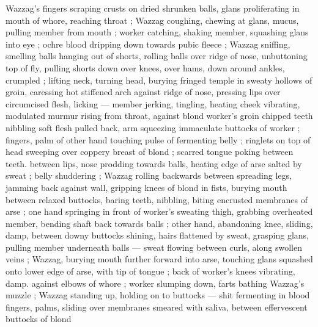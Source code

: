 Wazzag's fingers scraping crusts on dried shrunken balls, glans 
proliferating in mouth of whore, reaching throat ; Wazzag coughing, 
chewing at glans, mucus, pulling member from mouth ; worker 
catching, shaking member, squashing glans into eye ; ochre blood 
dripping down towards pubic fleece  ; Wazzag sniffing, 
smelling balls hanging out of shorts, rolling balls over ridge of nose, 
unbuttoning top of fly, pulling shorts down over knees, over hams, 
down around ankles, crumpled ; lifting neck, turning head, burying 
fringed temple in sweaty hollows of groin, caressing hot stiffened 
arch against ridge of nose, pressing lips over circumcised flesh, 
licking --- member jerking, tingling, heating {\dashcom} cheek vibrating, 
modulated murmur rising from throat, against blond worker's groin 
chipped teeth nibbling soft flesh pulled back, arm squeezing 
immaculate buttocks of worker ; fingers, palm of other hand touching 
pulse of fermenting belly ; ringlets on top of head sweeping over 
coppery breast of blond ; scarred tongue poking between teeth. 
between lips, nose prodding towards balls, heating edge of arse 
salted by sweat ; belly shuddering ; Wazzag rolling backwards 
between spreading legs, jamming back against wall, gripping knees 
of blond in fists, burying mouth between relaxed buttocks, baring 
teeth, nibbling, biting encrusted membranes of arse ; one hand 
springing in front of worker's sweating thigh, grabbing overheated 
member, bending shaft back towards balls ; other hand, abandoning 
knee, sliding, damp, between downy buttocks shining, hairs flattened 
by sweat, grasping glans, pulling member underneath balls --- sweat 
flowing between curls, along swollen veins ; Wazzag, burying mouth 
further forward into arse, touching glans squashed onto lower edge 
of arse, with tip of tongue ; back of worker's knees vibrating, damp. 
against elbows of whore ; worker slumping down, farts bathing 
Wazzag's muzzle ; Wazzag standing up, holding on to buttocks --- 
shit fermenting in blood {\dashcom} fingers, palms, sliding over membranes 
smeared with saliva, between effervescent buttocks of blond 
